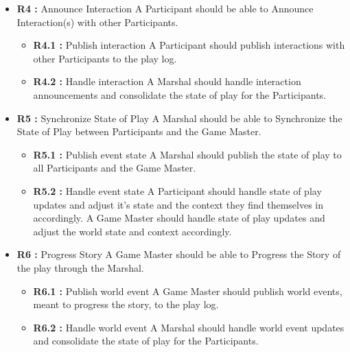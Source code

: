 \begin{itemize}
\item \textbf{R4 :} Announce Interaction
\newline
A Participant should be able to Announce Interaction(s) with other Participants.
\begin{itemize}
\item \textbf{R4.1 :} Publish interaction
\newline
A Participant should publish interactions with other Participants to the play log.
\item \textbf{R4.2 :} Handle interaction
\newline
A Marshal should handle interaction announcements and consolidate the state of play for the Participants.
\end{itemize}
\item \textbf{R5 :} Synchronize State of Play 
\newline
A Marshal should be able to Synchronize the State of Play between Participants and the Game Master.
\begin{itemize}
\item \textbf{R5.1 :} Publish event state
\newline
A Marshal should publish the state of play to all Participants and the Game Master.
\item \textbf{R5.2 :} Handle event state
\newline
A Participant should handle state of play updates and adjust it's state and the context they find themselves in accordingly.
\newline
A Game Master should handle state of play updates and adjust the world state and context accordingly.
\end{itemize}
\item \textbf{R6 :} Progress Story
\newline
A Game Master should be able to Progress the Story of the play through the Marshal.
\begin{itemize}
\item \textbf{R6.1 :} Publish world event 
\newline
A Game Master should publish world events, meant to progress the story, to the play log.
\item \textbf{R6.2 :} Handle world event
\newline
A Marshal should handle world event updates and consolidate the state of play for the Participants.
\end{itemize}
\end{itemize}

